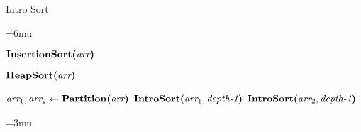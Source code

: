 \begin{frame}[squeeze]{Intro Sort}
	
	\begin{algorithm}[H]
		\unboldmath
		\thinmuskip=6mu
		\begin{algorithmic}[1]
			
			\State
			  \label{line:insertion-sort}
			\State $\textbf{InsertionSort(}\textit{arr}\textbf{)}$
			
			\State
			  \label{line:heap-sort}
			\State $\textbf{HeapSort(}\textit{arr}\textbf{)}$
			
			\State
			\Else {} \label{line:quick-sort}
			\State $\textit{arr}_1, \textit{arr}_2 \gets \textbf{Partition(}\textit{arr}\textbf{)}$
			\State $\textbf{IntroSort(}\textit{arr}_1, \textit{depth-1}\textbf{)}$
			\State $\textbf{IntroSort(}\textit{arr}_2, \textit{depth-1}\textbf{)}$
			\EndIf

			\EndProcedure
		\end{algorithmic}
		\boldmath
		\thinmuskip=3mu
	\end{algorithm}
	
\end{frame}